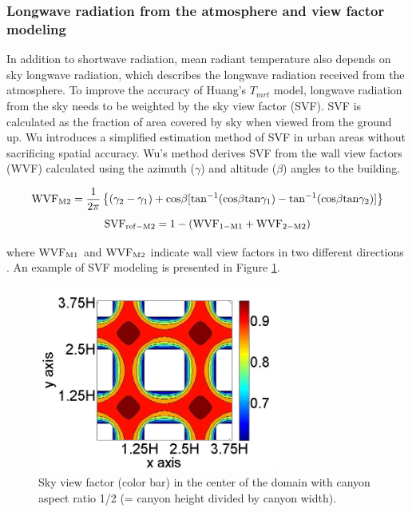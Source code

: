 \documentclass[preprint,3p,12pt,english]{elsarticle}
\begin{document}
\subsubsection{Longwave radiation from the atmosphere and view factor modeling}
In addition to shortwave radiation, mean radiant temperature also depends on sky longwave radiation, which describes the longwave radiation received from the atmosphere. To improve the accuracy of Huang's $T_{mrt}$ model, longwave radiation from the sky needs to be weighted by the sky view factor (SVF). SVF is calculated as the fraction of area covered by sky when viewed from the ground up. Wu \cite{wu2013calculation} introduces a simplified estimation method of SVF in urban areas without sacrificing spatial accuracy. Wu’s method derives SVF from the wall view factors (WVF) calculated using the azimuth ($\gamma$) and altitude ($\beta$) angles to the building.

\begin{equation}
\rm
WVF_{M2}=\frac{1}{2\pi}
\left\{
(\gamma_2-\gamma_1)+cos{\beta}[tan^{-1}(cos{\beta}tan{\gamma_1})-tan^{-1}(cos{\beta}tan\gamma_2)]
\right\}
\end{equation}
\begin{equation}
\rm SVF_{ref-M2}=1-(\rm WVF_{1-M1}+\rm WVF_{2-M2})
\end{equation}

where $\rm WVF_{M1}$ and $\rm WVF_{M2}$ indicate wall view factors in two different directions \cite{wu2013calculation}. An example of SVF modeling is presented in Figure \ref{Fig.SVFexample}. 

\begin{figure}[H]
\graphicspath{ {image/} }
\centerline{\includegraphics[width=8cm]{SVFSample.jpg}}
\caption{Sky view factor (color bar) in the center of the domain with canyon aspect ratio 1/2 (= canyon height divided by canyon width).}
\label{Fig.SVFexample}
\end{figure}
\end{document}

